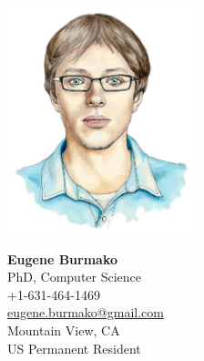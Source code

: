 \documentclass[margin, 10pt]{Stylesheet}
\begin{document}
\noindent\begin{minipage}{0.4\textwidth}%
\hspace*{-1.2cm}\includegraphics[width=5.5cm]{Photo.png}
\end{minipage}%
\hfill%
\begin{minipage}{0.6\textwidth}
{\large\bf Eugene Burmako}\\
PhD, Computer Science\\
+1-631-464-1469\\
\href{mailto:eugene.burmako@gmail.com}{eugene.burmako@gmail.com}\\
Mountain View, CA\\
US Permanent Resident\\
\end{minipage}
\end{document}
